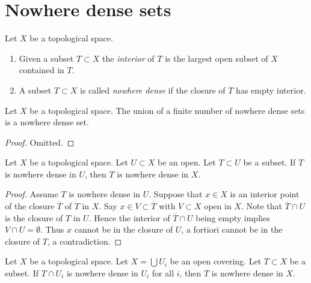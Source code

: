 \section{Nowhere dense sets}
\label{section-nowhere-dense}

\begin{definition}
\label{definition-nowhere-dense}
Let $X$ be a topological space.
\begin{enumerate}
\item Given a subset $T \subset X$ the {\it interior} of $T$ is the
largest open subset of $X$ contained in $T$.
\item A subset $T \subset X$ is called {\it nowhere dense} if the closure of
$T$ has empty interior.
\end{enumerate}
\end{definition}

\begin{lemma}
\label{lemma-nowhere-dense}
Let $X$ be a topological space. The union of a finite number of nowhere
dense sets is a nowhere dense set.
\end{lemma}

\begin{proof}
Omitted.
\end{proof}

\begin{lemma}
\label{lemma-image-nowhere-dense-open}
Let $X$ be a topological space.
Let $U \subset X$ be an open.
Let $T \subset U$ be a subset.
If $T$ is nowhere dense in $U$, then $T$ is nowhere dense in $X$.
\end{lemma}

\begin{proof}
Assume $T$ is nowhere dense in $U$.
Suppose that $x \in X$ is an interior point of the closure
$\overline{T}$ of $T$ in $X$. Say $x \in V \subset \overline{T}$
with $V \subset X$ open in $X$. Note that $\overline{T} \cap U$ is
the closure of $T$ in $U$. Hence the interior of $\overline{T} \cap U$
being empty implies $V \cap U = \emptyset$. Thus $x$ cannot be in the
closure of $U$, a fortiori cannot be in the closure of $T$, a contradiction.
\end{proof}

\begin{lemma}
\label{lemma-nowhere-dense-local}
Let $X$ be a topological space.
Let $X = \bigcup U_i$ be an open covering.
Let $T \subset X$ be a subset.
If $T \cap U_i$ is nowhere dense in $U_i$ for all $i$,
then $T$ is nowhere dense in $X$.
\end{lemma}

